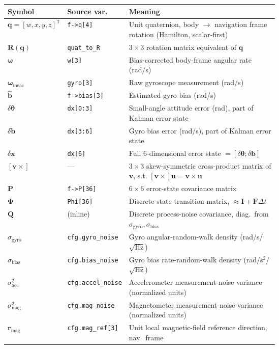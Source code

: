 \documentclass[11pt]{article}
\newcommand{\vect}[1]{\bm{#1}}
\newcommand{\mat}[1]{\bm{#1}}
\newcommand{\quat}{\vect{q}}
\newcommand{\transpose}{^{\mathsf{T}}}
\newcommand{\skewm}[1]{\left[#1\times\right]}
\begin{document}
\begin{table}[H]
\centering
\small
\begin{tabular}{@{}llp{0.62\linewidth}@{}}
\toprule
\textbf{Symbol} & \textbf{Source var.} & \textbf{Meaning} \\
\midrule
$\quat=[w,x,y,z]\transpose$ & \texttt{f->q[4]} & Unit quaternion, body $\to$ navigation frame rotation (Hamilton, scalar-first) \\
$\mat R(\quat)$ & \texttt{quat\_to\_R} & $3\times3$ rotation matrix equivalent of $\quat$ \\
$\vect\omega$ & \texttt{w[3]} & Bias-corrected body-frame angular rate (rad/s) \\
$\vect\omega_{\text{meas}}$ & \texttt{gyro[3]} & Raw gyroscope measurement (rad/s) \\
$\hat{\vect b}$ & \texttt{f->bias[3]} & Estimated gyro bias (rad/s) \\
$\delta\vect\theta$ & \texttt{dx[0:3]} & Small-angle attitude error (rad), part of Kalman error state \\
$\delta\vect b$ & \texttt{dx[3:6]} & Gyro bias error (rad/s), part of Kalman error state \\
$\delta\vect x$ & \texttt{dx[6]} & Full $6$-dimensional error state $=[\delta\vect\theta;\delta\vect b]$ \\
$\skewm{\vect v}$ & --- & $3\times3$ skew-symmetric cross-product matrix of $\vect v$, s.t. $\skewm{\vect v}\vect u = \vect v\times\vect u$ \\
$\mat P$ & \texttt{f->P[36]} & $6\times6$ error-state covariance matrix \\
$\mat\Phi$ & \texttt{Phi[36]} & Discrete state-transition matrix, $\approx \mat I + \mat F\Delta t$ \\
$\mat Q$ & (inline) & Discrete process-noise covariance, diag.\ from $\sigma_{\text{gyro}},\sigma_{\text{bias}}$ \\
$\sigma_{\text{gyro}}$ & \texttt{cfg.gyro\_noise} & Gyro angular-random-walk density (rad/s/$\sqrt{\mathrm{Hz}}$) \\
$\sigma_{\text{bias}}$ & \texttt{cfg.bias\_noise} & Gyro bias rate-random-walk density (rad/s$^2$/$\sqrt{\mathrm{Hz}}$) \\
$\sigma_{\text{acc}}^2$ & \texttt{cfg.accel\_noise} & Accelerometer measurement-noise variance (normalized units) \\
$\sigma_{\text{mag}}^2$ & \texttt{cfg.mag\_noise} & Magnetometer measurement-noise variance (normalized units) \\
$\vect r_{\text{mag}}$ & \texttt{cfg.mag\_ref[3]} & Unit local magnetic-field reference direction, nav.\ frame \\

\end{tabular}
\end{table}
\end{document}
